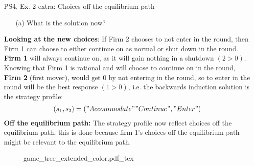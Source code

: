 \begin{frame}{PS4, Ex. 2 extra: Choices off the equilibrium path}
  \begin{multicols}{2}
    \begin{itemize}
      \item[(a)] What is the solution now?
    \end{itemize}
    \textbf{Looking at the new choices}: If Firm 2 chooses to not enter in the  round, then Firm 1 can choose to either continue on as normal or shut down in the  round.\\\medskip
    \textbf{Firm 1} will always continue on, as it will gain nothing in a shutdown $(2>0)$.\\\medskip
    Knowing that Firm 1 is rational and will choose to continue on in the  round, \textbf{Firm 2} (first mover), would get 0 by not entering in the  round, so to enter in the  round will be the best response $(1>0)$, i.e. the backwards induction solution is the strategy profile:
      \begin{align*}
        (s_1,s_2)=("Accommodate""Continue","Enter")
      \end{align*}
    \textbf{Off the equilibrium path:} The strategy profile now reflect choices off the equilibrium path, this is done because firm 1's choices off the equilibrium path might be relevant to the equilibrium path.
  \vfill\null \columnbreak
    \begin{figure}[!h]
      \begin{center}
      \def\svgwidth{1.0\columnwidth}
      {game_tree_extended_color.pdf_tex}
      \end{center}
    \end{figure}
  \vfill\null
  \end{multicols}
\end{frame}


